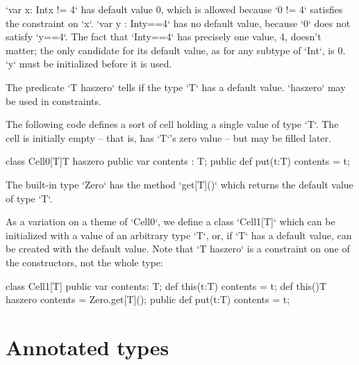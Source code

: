 \begin{ex}
\xcd`var x: Int{x != 4}` has default value 0, which is allowed
because \xcd`0 != 4` satisfies the constraint on \xcd`x`. 
\xcd`var y : Int{y==4}` has no default value, because \xcd`0` does not satisfy \xcd`y==4`.
The fact that \xcd`Int{y==4}` has precisely one value, \viz{} 4, doesn't
matter; the only candidate for its default value, as for any subtype of
\xcd`Int`, is 0. \xcd`y` must be initialized before it is used.
\end{ex}

The predicate \xcd`T haszero` tells if the type \xcd`T` has a default value.
\xcd`haszero` may be used in constraints. 

\begin{ex}
The following code defines a sort of cell holding a single value of type
\xcd`T`. The cell is initially empty -- that is, has \xcd`T`'s zero value --
but may be filled later. 
\begin{xten}
class Cell0[T]{T haszero} {
  public var contents : T;
  public def put(t:T) { contents = t; }
}
\end{xten}
%
\end{ex}

The built-in type \xcd`Zero` has the method \xcd`get[T]()` which
returns the default value of type \xcd`T`.  

\begin{ex}
As a variation on a theme of \xcd`Cell0`, we define a class \xcd`Cell1[T]` which can be initialized with a value of an arbitrary
type
\xcd`T`, or, if \xcd`T` has a default value, can be created with the default
value.  Note that \xcd`T haszero` is a constraint on one of
the constructors, not the whole type:  
\begin{xten}
class Cell1[T] {
  public var contents: T;
  def this(t:T) { contents = t; }
  def this(){T haszero} { contents = Zero.get[T](); }
  public def put(t:T) {contents = t;}
}
\end{xten}
%

\end{ex}

\section{Annotated types}
\label{AnnotatedTypes}


